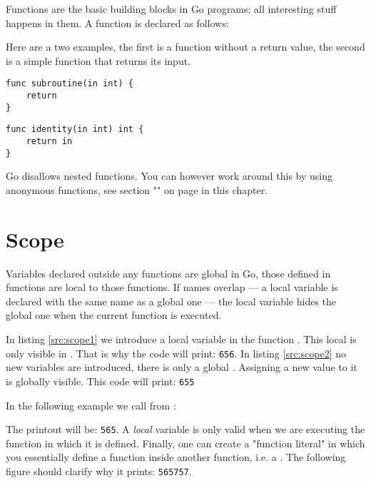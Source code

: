 
\noindent{}Functions are the basic building blocks in Go programs; all interesting
stuff happens in them. A function is declared as follows:

\showremarks
Here are a two examples, the first is a function without a return value,
the second is a simple function that returns its input.
\begin{lstlisting}
func subroutine(in int) {
    return
}
\end{lstlisting}
\begin{lstlisting}
func identity(in int) int {
    return in
}
\end{lstlisting}
Go disallows nested functions.
You can however
work around this by using anonymous functions, see section
"" on page \pageref{sec:functions as values} 
in this chapter.

\section{Scope}
Variables declared outside any functions are global in Go, those
defined in functions are local to those functions. If names overlap --- a
local variable is declared with the same name as a global one --- the
local variable hides the global one when the current function is
executed.

\begin{minipage}{.5\textwidth}

\hfill
\vfill
\end{minipage}
\hfill
\begin{minipage}{.5\textwidth}

\hfill
\vfill
\end{minipage}

In listing \ref{src:scope1} we introduce a local variable 
in the function .
This local  is only visible in . That is
why the code will print: \texttt{656}.
In listing \ref{src:scope2} no new variables are introduced, there
is only a global .
Assigning a new value to it is globally visible. This code will
print: \texttt{655}

In the following example we call  from :

The printout will be: \texttt{565}. A \emph{local} variable is only
valid when we are executing the function in which it is defined. 
Finally, one can create
a "function
literal" in which you essentially define a function inside another
function, i.e. a . 
The following figure should clarify why it
prints: \texttt{565757}. 


